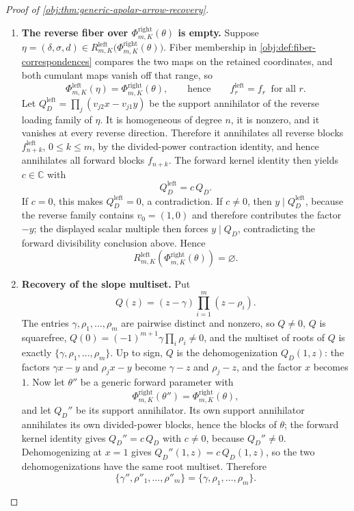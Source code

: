 \begin{proof}[Proof of \cref{obj:thm:generic-apolar-arrow-recovery}]
\begin{enumerate}
\item \textbf{The reverse fiber over \(\Phi^{\mathrm{right}}_{m,K}(\theta)\) is empty.}  Suppose \(\eta=(\delta,\sigma,d)\in R^{\mathrm{left}}_{m,K}\!\bigl(\Phi^{\mathrm{right}}_{m,K}(\theta)\bigr)\).  Fiber membership in \cref{obj:def:fiber-correspondences} compares the two maps on the retained coordinates, and both cumulant maps vanish off that range, so
\[
\Phi^{\mathrm{left}}_{m,K}(\eta)=\Phi^{\mathrm{right}}_{m,K}(\theta),
\qquad\text{hence}\qquad
f^{\mathrm{left}}_r=f_r\ \text{ for all }r .
\]
Let \(Q_D^{\mathrm{left}}=\prod_j(v_{j2}x-v_{j1}y)\) be the support annihilator of the reverse loading family of \(\eta\).  It is homogeneous of degree \(n\), it is nonzero, and it vanishes at every reverse direction.  Therefore it annihilates all reverse blocks \(f^{\mathrm{left}}_{n+k}\), \(0\le k\le m\), by the divided-power contraction identity, and hence annihilates all forward blocks \(f_{n+k}\).  The forward kernel identity then yields \(c\in\mathbb C\) with
\[
Q_D^{\mathrm{left}}=c\,Q_D .
\]
If \(c=0\), this makes \(Q_D^{\mathrm{left}}=0\), a contradiction.  If \(c\ne0\), then \(y\mid Q_D^{\mathrm{left}}\), because the reverse family contains \(v_0=(1,0)\) and therefore contributes the factor \(-y\); the displayed scalar multiple then forces \(y\mid Q_D\), contradicting the forward divisibility conclusion above.  Hence
\[
R^{\mathrm{left}}_{m,K}\!\left(\Phi^{\mathrm{right}}_{m,K}(\theta)\right)=\varnothing .
\]

\item \textbf{Recovery of the slope multiset.}  Put
\[
Q(z)=(z-\gamma)\prod_{i=1}^{m}(z-\rho_i).
\]
The entries \(\gamma,\rho_1,\ldots,\rho_m\) are pairwise distinct and nonzero, so \(Q\ne0\), \(Q\) is squarefree, \(Q(0)=(-1)^{m+1}\gamma\prod_i\rho_i\ne0\), and the multiset of roots of \(Q\) is exactly \(\{\gamma,\rho_1,\ldots,\rho_m\}\).  Up to sign, \(Q\) is the dehomogenization \(Q_D(1,z)\): the factors \(\gamma x-y\) and \(\rho_jx-y\) become \(\gamma-z\) and \(\rho_j-z\), and the factor \(x\) becomes \(1\).  Now let \(\theta''\) be a generic forward parameter with
\[
\Phi^{\mathrm{right}}_{m,K}(\theta'')=\Phi^{\mathrm{right}}_{m,K}(\theta),
\]
and let \(Q_D''\) be its support annihilator.  Its own support annihilator annihilates its own divided-power blocks, hence the blocks of \(\theta\); the forward kernel identity gives \(Q_D''=c\,Q_D\) with \(c\ne0\), because \(Q_D''\ne0\).  Dehomogenizing at \(x=1\) gives \(Q_D''(1,z)=c\,Q_D(1,z)\), so the two dehomogenizations have the same root multiset.  Therefore
\[
\{\gamma'',\rho''_1,\ldots,\rho''_m\}=\{\gamma,\rho_1,\ldots,\rho_m\}.
\]


\end{enumerate}
\end{proof}
